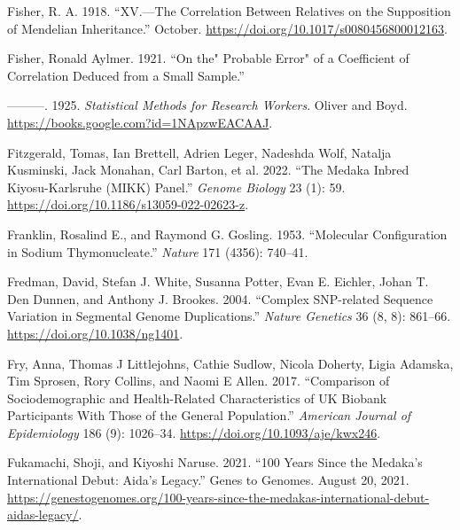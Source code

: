 \documentclass[
]{book}
\newlength{\cslhangindent}
\newlength{\cslentryspacingunit} %
\newenvironment{CSLReferences}[2] %
 {%
  \setlength{\parindent}{0pt}
  \ifodd #1
  \let\oldpar\par
  \def\par{\hangindent=\cslhangindent\oldpar}
  \fi
  \setlength{\parskip}{#2\cslentryspacingunit}
 }%
 {}
\begin{document}
\begin{CSLReferences}{1}{0}
\leavevmode{}%
Fisher, R. A. 1918. {``{XV}.---{The Correlation} Between {Relatives} on the {Supposition} of {Mendelian Inheritance}.''} October. \url{https://doi.org/10.1017/s0080456800012163}.

\leavevmode{}%
Fisher, Ronald Aylmer. 1921. {``On the{"} {Probable Error}{"} of a {Coefficient} of {Correlation Deduced} from a {Small Sample}.''}

\leavevmode{}%
---------. 1925. \emph{Statistical {Methods} for {Research Workers}}. {Oliver and Boyd}. \url{https://books.google.com?id=1NApzwEACAAJ}.

\leavevmode{}%
Fitzgerald, Tomas, Ian Brettell, Adrien Leger, Nadeshda Wolf, Natalja Kusminski, Jack Monahan, Carl Barton, et al. 2022. {``The {Medaka Inbred Kiyosu-Karlsruhe} ({MIKK}) Panel.''} \emph{Genome Biology} 23 (1): 59. \url{https://doi.org/10.1186/s13059-022-02623-z}.

\leavevmode{}%
Franklin, Rosalind E., and Raymond G. Gosling. 1953. {``Molecular Configuration in Sodium Thymonucleate.''} \emph{Nature} 171 (4356): 740--41.

\leavevmode{}%
Fredman, David, Stefan J. White, Susanna Potter, Evan E. Eichler, Johan T. Den Dunnen, and Anthony J. Brookes. 2004. {``Complex {SNP-related} Sequence Variation in Segmental Genome Duplications.''} \emph{Nature Genetics} 36 (8, 8): 861--66. \url{https://doi.org/10.1038/ng1401}.

\leavevmode{}%
Fry, Anna, Thomas J Littlejohns, Cathie Sudlow, Nicola Doherty, Ligia Adamska, Tim Sprosen, Rory Collins, and Naomi E Allen. 2017. {``Comparison of {Sociodemographic} and {Health-Related Characteristics} of {UK Biobank Participants With Those} of the {General Population}.''} \emph{American Journal of Epidemiology} 186 (9): 1026--34. \url{https://doi.org/10.1093/aje/kwx246}.

\leavevmode{}%
Fukamachi, Shoji, and Kiyoshi Naruse. 2021. {``100 Years Since the Medaka's International Debut: {Aida}'s Legacy.''} {Genes to Genomes}. August 20, 2021. \url{https://genestogenomes.org/100-years-since-the-medakas-international-debut-aidas-legacy/}.


\end{CSLReferences}
\end{document}
